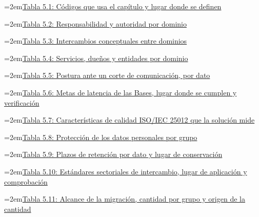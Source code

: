 \documentclass[11pt]{article}
\begin{document}
\noindent\hangindent=2em\hyperref[tab:t01]{Tabla 5.1: Códigos que usa el capítulo y lugar donde se definen}\dotfill\pageref{tab:t01}\par\vspace{0.4\baselineskip}
\noindent\hangindent=2em\hyperref[tab:t_resp]{Tabla 5.2: Responsabilidad y autoridad por dominio}\dotfill\pageref{tab:t_resp}\par\vspace{0.4\baselineskip}
\noindent\hangindent=2em\hyperref[tab:t_inter]{Tabla 5.3: Intercambios conceptuales entre dominios}\dotfill\pageref{tab:t_inter}\par\vspace{0.4\baselineskip}
\noindent\hangindent=2em\hyperref[tab:t_ent]{Tabla 5.4: Servicios, dueños y entidades por dominio}\dotfill\pageref{tab:t_ent}\par\vspace{0.4\baselineskip}
\noindent\hangindent=2em\hyperref[tab:t10]{Tabla 5.5: Postura ante un corte de comunicación, por dato}\dotfill\pageref{tab:t10}\par\vspace{0.4\baselineskip}
\noindent\hangindent=2em\hyperref[tab:t11]{Tabla 5.6: Metas de latencia de las Bases, lugar donde se cumplen y verificación}\dotfill\pageref{tab:t11}\par\vspace{0.4\baselineskip}
\noindent\hangindent=2em\hyperref[tab:t12]{Tabla 5.7: Características de calidad ISO/IEC 25012 que la solución mide}\dotfill\pageref{tab:t12}\par\vspace{0.4\baselineskip}
\noindent\hangindent=2em\hyperref[tab:t13]{Tabla 5.8: Protección de los datos personales por grupo}\dotfill\pageref{tab:t13}\par\vspace{0.4\baselineskip}
\noindent\hangindent=2em\hyperref[tab:t14]{Tabla 5.9: Plazos de retención por dato y lugar de conservación}\dotfill\pageref{tab:t14}\par\vspace{0.4\baselineskip}
\noindent\hangindent=2em\hyperref[tab:t15]{Tabla 5.10: Estándares sectoriales de intercambio, lugar de aplicación y comprobación}\dotfill\pageref{tab:t15}\par\vspace{0.4\baselineskip}
\noindent\hangindent=2em\hyperref[tab:t16]{Tabla 5.11: Alcance de la migración, cantidad por grupo y origen de la cantidad}\dotfill\pageref{tab:t16}\par\vspace{0.4\baselineskip}
\end{document}
